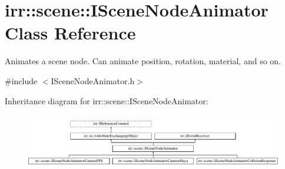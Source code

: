 \hypertarget{classirr_1_1scene_1_1ISceneNodeAnimator}{}\section{irr\+:\+:scene\+:\+:I\+Scene\+Node\+Animator Class Reference}
\label{classirr_1_1scene_1_1ISceneNodeAnimator}


Animates a scene node. Can animate position, rotation, material, and so on.  




{\ttfamily \#include $<$I\+Scene\+Node\+Animator.\+h$>$}

Inheritance diagram for irr\+:\+:scene\+:\+:I\+Scene\+Node\+Animator\+:\begin{figure}[H]
\begin{center}
\leavevmode
\includegraphics[height=2.480620cm]{classirr_1_1scene_1_1ISceneNodeAnimator}
\end{center}
\end{figure}

